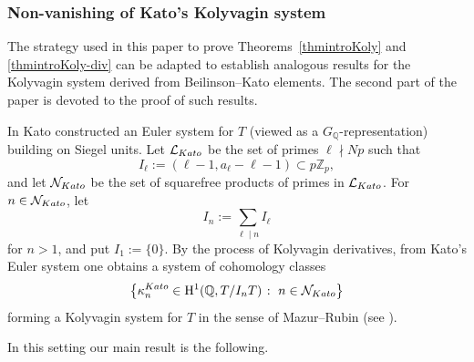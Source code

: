 \documentclass[10pt,reqno]{amsart}
\numberwithin{equation}{section}
\theoremstyle{plain}
\theoremstyle{definition}
\theoremstyle{definition}
\theoremstyle{plain}
\theoremstyle{plain}
\theoremstyle{plain}
\theoremstyle{plain}
\theoremstyle{plain}
\theoremstyle{plain}
\newcommand{\Z}{\mathbb{Z}}
\newcommand{\Q}{\mathbb{Q}}
\DeclareMathOperator{\frob}{Frob}
\newcommand{\rH}{\mathrm{H}}
\begin{document}
\subsubsection*{Non-vanishing of Kato's Kolyvagin system}

The strategy 
used
in this paper 
to prove Theorems~\ref{thmintroKoly} and \ref{thmintroKoly-div} can be adapted to establish analogous results for the Kolyvagin system derived from Beilinson--Kato elements. The second part of the paper is devoted to the proof of such results.

In \cite{kato-euler-systems} Kato constructed an Euler system %
for $T$ (viewed as a $G_\Q$-representation) building on Siegel units.
Let $\mathcal{L}_{\rm Kato}$ be the set of primes $\ell\nmid Np$ such that
\[
I_\ell:=(\ell-1,a_\ell-\ell-1)\subset p\Z_p,
\]
and let
$\mathcal{N}_{\rm Kato}$ be the set of squarefree products of primes in $\mathcal{L}_{\rm Kato}$. For %
$n\in \mathcal{N}_{\rm Kato}$, let
\[
I_n:=\sum_{\ell\mid n}I_\ell 
\]
for $n>1$, and put $I_1:=\{0\}$.
By the process of Kolyvagin derivatives, from Kato's Euler system 
one obtains a system of cohomology classes 
\[
\bigl\{\kappa^{\rm Kato}_{n}\in \rH^1(\Q, T/I_nT)\;\colon\;n\in \mathcal{N}_{\rm Kato}\bigr\}
\]
forming a Kolyvagin system for $T$ in the sense of Mazur--Rubin (see \cite[Thm.~3.2.4]{mazrub}). 

In this setting our main result is the following. 


\end{document}
